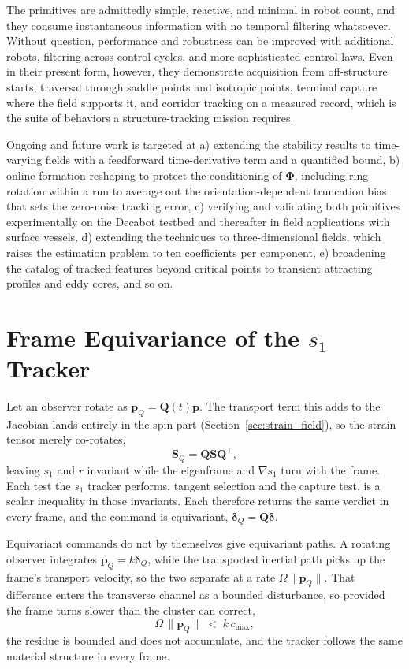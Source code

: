 \documentclass[lettersize,journal]{IEEEtran}
\begin{document}
The primitives are admittedly simple, reactive, and minimal in robot
count, and they consume instantaneous information with no temporal
filtering whatsoever. Without question, performance and robustness can
be improved with additional robots, filtering across control cycles,
and more sophisticated control laws. Even in their present form,
however, they demonstrate acquisition from off-structure starts,
traversal through saddle points and isotropic points, terminal capture
where the field supports it, and corridor tracking on a measured
record, which is the suite of behaviors a structure-tracking mission
requires.

Ongoing and future work is targeted at a) extending the stability
results to time-varying fields with a feedforward time-derivative term
and a quantified bound, b) online formation reshaping to protect the
conditioning of $\boldsymbol{\Phi}$, including ring rotation within a
run to average out the orientation-dependent truncation bias that sets
the zero-noise tracking error, c) verifying and validating both
primitives experimentally on the Decabot testbed and thereafter in
field applications with surface vessels, d) extending the techniques
to three-dimensional fields, which raises the estimation problem to
ten coefficients per component, e) broadening the catalog of tracked
features beyond critical points to transient attracting profiles and
eddy cores, and so on.

\appendices

\section{Frame Equivariance of the $s_1$ Tracker}
\label{app:equivariance}

Let an observer rotate as $\mathbf{p}_Q = \mathbf{Q}(t)\mathbf{p}$. The
transport term this adds to the Jacobian lands entirely in the spin part
(Section~\ref{sec:strain_field}), so the strain tensor merely co-rotates,
\begin{equation}
    \mathbf{S}_Q = \mathbf{Q}\mathbf{S}\mathbf{Q}^\top ,
\end{equation}
leaving $s_1$ and $r$ invariant while the eigenframe and $\nabla s_1$
turn with the frame. Each test the $s_1$ tracker performs, tangent
selection and the capture test, is a scalar inequality in those
invariants.
Each therefore returns the same verdict in every frame, and the command
is equivariant, $\boldsymbol{\delta}_Q = \mathbf{Q}\boldsymbol{\delta}$.

Equivariant commands do not by themselves give equivariant paths. A
rotating observer integrates $\dot{\mathbf{p}}_Q = k\boldsymbol{\delta}_Q$,
while the transported inertial path picks up the frame's transport
velocity, so the two separate at a rate $\Omega\lVert\mathbf{p}_Q\rVert$.
That difference enters the transverse channel as a bounded disturbance,
so provided the frame turns slower than the cluster can correct,
\begin{equation}
    \Omega\,\lVert\mathbf{p}_Q\rVert \;<\; k\,c_{\max} ,
\end{equation}
the residue is bounded and does not accumulate, and the tracker follows
the same material structure in every frame.
\end{document}
